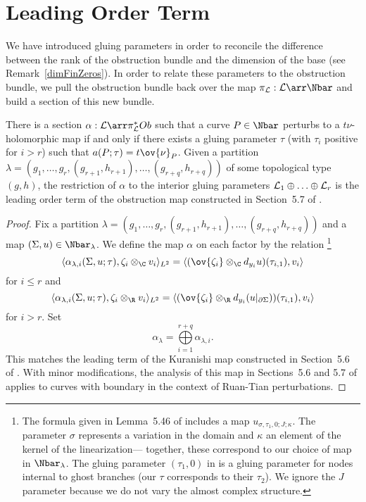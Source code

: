\section{Leading Order Term} \label{lotS}

We have introduced gluing parameters in order to reconcile the difference between the rank of the obstruction bundle and the dimension of the base (see Remark~\ref{dimFinZeros}). In order to relate these parameters to the obstruction bundle, we pull the obstruction bundle back over the map $\pi_{\L}:\L\arr \Nbar$ and build a section of this new bundle.

\begin{lemma} \label{lot}
There is a section $\alpha:\L \arr \pi_{\L}^*Ob$ such that a curve $P \in \Nbar$ perturbs to a $t\nu$-holomorphic map if and only if there exists a gluing parameter $\tau$ (with $\tau_i$ positive for $i>r$) such that $a(P;\tau)=t\ov{\nu}_P$. Given a partition $\lambda=(g_1,\ldots,g_r,(g_{r+1},h_{r+1}),\ldots,(g_{r+q},h_{r+q}))$ of some topological type $(g,h)$, the restriction of $\alpha$ to the interior gluing parameters $\mathcal{L}_1 \oplus \ldots \oplus \mathcal{L}_r$ is the leading order term of the obstruction map constructed in Section~5.7 of \cite{dw}.
\begin{proof}
Fix a partition $\lambda=(g_1,\ldots,g_r,(g_{r+1},h_{r+1}),\ldots,(g_{r+q},h_{r+q}))$ and a map $(\Sigma,u) \in \Nbar_\lambda$. We define the map $\alpha$ on each factor by the relation \footnote{The formula given in Lemma~5.46 of \cite{dw} includes a map $u_{\sigma,\tau_1,0;J;\kappa}$. The parameter $\sigma$ represents a variation in the domain and $\kappa$ an element of the kernel of the linearization--- together, these correspond to our choice of map in $\Nbar_\lambda$. The gluing parameter $(\tau_1,0)$ in \cite{dw} is a gluing parameter for nodes internal to ghost branches (our $\tau$ corresponds to their $\tau_2$). We ignore the $J$ parameter because we do not vary the almost complex structure.}
\[
\langle \alpha_{\lambda,i}(\Sigma,u;\tau), \zeta_i \otimes_\C v_i \rangle_{L^2} = \langle (\ov{\zeta_i} \otimes_\C d_{y_i}u)(\tau_{i,1}), v_i \rangle
\]
for $i \leq r$ and 
\[
\langle \alpha_{\lambda,i}(\Sigma,u;\tau), \zeta_i \otimes_\R v_i \rangle_{L^2} = \langle (\ov{\zeta_i} \otimes_\R d_{y_i}(u|_{\partial\Sigma}))(\tau_{i,1}), v_i \rangle
\]
for $i>r$. Set
\[
\alpha_\lambda = \bigoplus\limits_{i=1}^{r+q} \alpha_{\lambda,i}.
\]
This matches the leading term of the Kuranishi map constructed in Section~5.6 of \cite{dw}. With minor modifications, the analysis of this map in Sections~5.6 and 5.7 of \cite{dw} applies to curves with boundary in the context of Ruan-Tian perturbations.
\end{proof}
\end{lemma}
